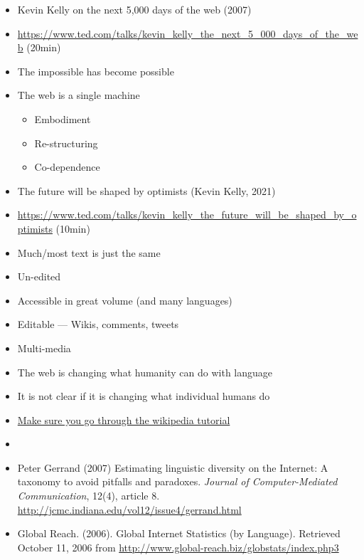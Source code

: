 \documentclass[a4paper,landscape,headrule,footrule,xetex]{foils}
\begin{document}
\MyLogo{}
\begin{itemize}
\item Kevin Kelly on the next 5,000 days of the web (2007)
\item
  \url{https://www.ted.com/talks/kevin_kelly_the_next_5_000_days_of_the_web}
  (20min)
\item The impossible has become possible
\item The web is a single machine
  \begin{itemize}
  \item Embodiment
  \item Re-structuring
  \item Co-dependence
  \end{itemize}
\item The future will be shaped by optimists (Kevin Kelly, 2021)
\item \url{https://www.ted.com/talks/kevin_kelly_the_future_will_be_shaped_by_optimists} (10min)

\end{itemize}


\begin{itemize}
\item Much/most text is just the same
\item Un-edited
\item Accessible in great volume (and many languages)
\item Editable --- Wikis, comments, tweets
\item Multi-media
\end{itemize}


\begin{itemize}
\item The web is changing what humanity can do with language
\item It is not clear if it is changing what individual humans do
\bigskip
\item \href{https://en.wikipedia.org/wiki/Wikipedia:Tutorial}{Make sure you go through the wikipedia tutorial}
\end{itemize}




\begin{itemize}
\item {}
\item Peter Gerrand (2007) Estimating linguistic diversity on the
  Internet: A taxonomy to avoid pitfalls and
  paradoxes. \textit{Journal of Computer-Mediated Communication},
  12(4), article
  8. \url{http://jcmc.indiana.edu/vol12/issue4/gerrand.html}
\item Global Reach. (2006). Global Internet Statistics (by
  Language). Retrieved October 11, 2006 from
  \url{http://www.global-reach.biz/globstats/index.php3}
\end{itemize}

\end{document}
